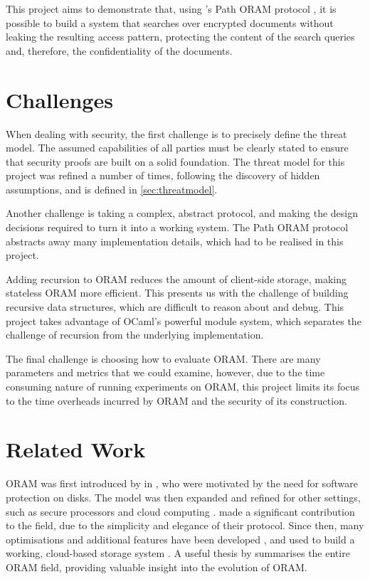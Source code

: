 \documentclass[12pt,a4paper,twoside,openright]{report}
\begin{document}
This project aims to demonstrate that, using \citeauthor{stefanov2013path}'s Path ORAM protocol \cite{stefanov2013path}, it is possible to build a system that searches over encrypted documents without leaking the resulting access pattern, protecting the content of the search queries and, therefore, the confidentiality of the documents.

\section{Challenges}

When dealing with security, the first challenge is to precisely define the threat model. The assumed capabilities of all parties must be clearly stated to ensure that security proofs are built on a solid foundation. The threat model for this project was refined a number of times, following the discovery of hidden assumptions, and is defined in \cref{sec:threatmodel}.

Another challenge is taking a complex, abstract protocol, and making the design decisions required to turn it into a working system. The Path ORAM protocol abstracts away many implementation details, which had to be realised in this project.

Adding recursion to ORAM reduces the amount of client-side storage, making stateless ORAM more efficient. This presents us with the challenge of building recursive data structures, which are difficult to reason about and debug. This project takes advantage of OCaml's powerful module system, which separates the challenge of recursion from the underlying implementation.

The final challenge is choosing how to evaluate ORAM. There are many parameters and metrics that we could examine, however, due to the time consuming nature of running experiments on ORAM, this project limits its focus to the time overheads incurred by ORAM and the security of its construction.

\section{Related Work}

ORAM was first introduced by \citet{goldreich1996software} in \citeyear{goldreich1996software}, who were motivated by the need for software protection on disks. The model was then expanded and refined for other settings, such as secure processors and cloud computing \cite{shi2011oblivious}. \citet{stefanov2013path} made a significant contribution to the field, due to the simplicity and elegance of their protocol. Since then, many optimisations and additional features have been developed \cite{yu2014enhancing,ren2015constants,moataz2015resizable}, and used to build a working, cloud-based storage system \cite{stefanov2013oblivistore}. A useful thesis by \citet{teeuwen2015evolution} summarises the entire ORAM field, providing valuable insight into the evolution of ORAM.
\end{document}
